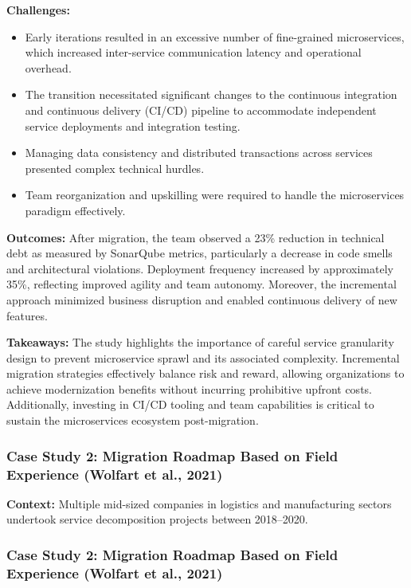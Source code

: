 \documentclass[12pt]{article}
\begin{document}
\textbf{Challenges:}  
\begin{itemize}
    \item Early iterations resulted in an excessive number of fine-grained microservices, which increased inter-service communication latency and operational overhead.
    \item The transition necessitated significant changes to the continuous integration and continuous delivery (CI/CD) pipeline to accommodate independent service deployments and integration testing.
    \item Managing data consistency and distributed transactions across services presented complex technical hurdles.
    \item Team reorganization and upskilling were required to handle the microservices paradigm effectively.
\end{itemize}

\textbf{Outcomes:}  
After migration, the team observed a 23\% reduction in technical debt as measured by SonarQube metrics, particularly a decrease in code smells and architectural violations. Deployment frequency increased by approximately 35\%, reflecting improved agility and team autonomy. Moreover, the incremental approach minimized business disruption and enabled continuous delivery of new features.

\textbf{Takeaways:}  
The study highlights the importance of careful service granularity design to prevent microservice sprawl and its associated complexity. Incremental migration strategies effectively balance risk and reward, allowing organizations to achieve modernization benefits without incurring prohibitive upfront costs. Additionally, investing in CI/CD tooling and team capabilities is critical to sustain the microservices ecosystem post-migration.


\vspace{0.5cm}

\subsubsection{Case Study 2: Migration Roadmap Based on Field Experience (Wolfart et al., 2021)}

\textbf{Context:} Multiple mid-sized companies in logistics and manufacturing sectors undertook service decomposition projects between 2018–2020.

\subsubsection{Case Study 2: Migration Roadmap Based on Field Experience (Wolfart et al., 2021)}
\end{document}
